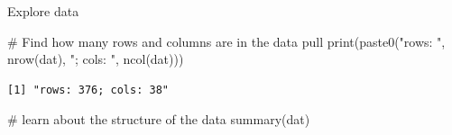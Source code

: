 \documentclass[
  letterpaper,
  oneside,
  open=any]{scrbook}
\newenvironment{Shaded}{\begin{snugshade}}{\end{snugshade}}
\newcommand{\CommentTok}[1]{\textcolor[rgb]{0.37,0.37,0.37}{#1}}
\newcommand{\FunctionTok}[1]{\textcolor[rgb]{0.28,0.35,0.67}{#1}}
\newcommand{\NormalTok}[1]{\textcolor[rgb]{0.00,0.23,0.31}{#1}}
\newcommand{\StringTok}[1]{\textcolor[rgb]{0.13,0.47,0.30}{#1}}
\begin{document}
Explore data

\begin{Shaded}
\begin{Highlighting}[]
\CommentTok{\# Find how many rows and columns are in the data pull}
\FunctionTok{print}\NormalTok{(}\FunctionTok{paste0}\NormalTok{(}\StringTok{"rows: "}\NormalTok{, }\FunctionTok{nrow}\NormalTok{(dat), }\StringTok{"; cols: "}\NormalTok{, }\FunctionTok{ncol}\NormalTok{(dat)))}
\end{Highlighting}
\end{Shaded}

\begin{verbatim}
[1] "rows: 376; cols: 38"
\end{verbatim}

\begin{Shaded}
\begin{Highlighting}[]
\CommentTok{\# learn about the structure of the data}
\FunctionTok{summary}\NormalTok{(dat)}
\end{Highlighting}
\end{Shaded}
\end{document}
